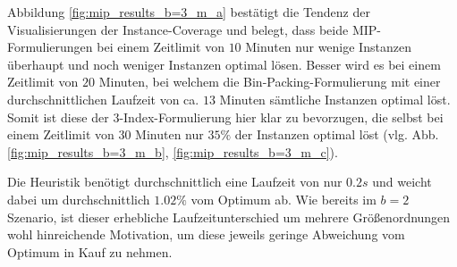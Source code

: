 Abbildung \ref{fig:mip_results_b=3_m_a} bestätigt die Tendenz der Visualisierungen der Instance-Coverage und belegt,
dass beide MIP-Formulierungen bei einem Zeitlimit von $10$ Minuten nur wenige Instanzen überhaupt und noch weniger
Instanzen optimal lösen.
Besser wird es bei einem Zeitlimit von $20$ Minuten, bei welchem die Bin-Packing-Formulierung mit einer durchschnittlichen
Laufzeit von ca. $13$ Minuten sämtliche Instanzen optimal löst. Somit ist diese der 3-Index-Formulierung hier klar zu bevorzugen,
die selbst bei einem Zeitlimit von $30$ Minuten nur $35 \%$ der Instanzen optimal löst (vlg. Abb. \ref{fig:mip_results_b=3_m_b},
\ref{fig:mip_results_b=3_m_c}).

Die Heuristik benötigt durchschnittlich eine Laufzeit von nur $0.2s$ und weicht dabei um durchschnittlich
$1.02 \%$ vom Optimum ab. Wie bereits im $b = 2$ Szenario, ist dieser erhebliche Laufzeitunterschied
um mehrere Größenordnungen wohl hinreichende Motivation, um diese jeweils geringe Abweichung vom Optimum in Kauf zu nehmen.

